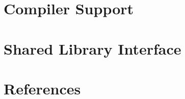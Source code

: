 \documentclass{scrartcl}
\newcommand{\mylisting}[2][]{%
}
\begin{document}

\clearpage
\begin{appendices}

\makeatletter
{}
\makeatother


\section{Compiler Support}
\label{app:compiler}


\section{Shared Library Interface}
\label{app:so}

\mylisting[
  caption={[FFI usage example]FFI usage example.},
  firstline=8,fontadjust,language=C,
  label=lst:so]{../src/rstsp/librstsp/test.c}

%

\section{References}
\printbibliography%

\end{appendices}
\end{document}
